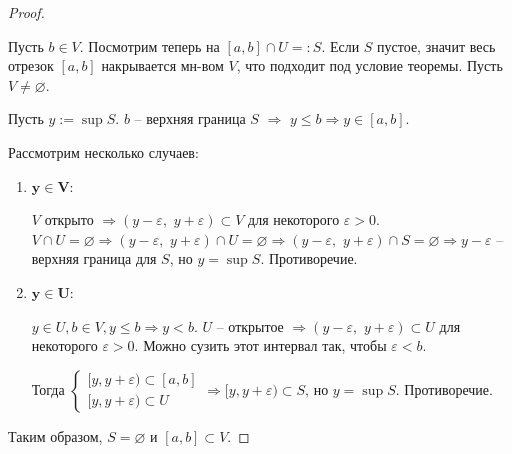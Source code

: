\begin{proof} $ $

    Пусть $b \in V$. Посмотрим теперь на $[a, b] \cap U =: S$. Если 
    $S$ пустое, значит весь отрезок $[a, b]$ накрывается мн-вом $V$,
    что подходит под условие теоремы. Пусть $V \neq \varnothing$.

    Пусть $y := \sup S$. $b$ -- верхняя граница $S$ $\Rightarrow$
    $y \leqslant b \Rightarrow y \in [a, b]$.

    Рассмотрим несколько случаев:
    \begin{enumerate}
        \item $\mathbf{y \in V}$:
        
        $V$ открыто $\Rightarrow (y - \varepsilon,\,\, y + \varepsilon)
        \subset V$ для некоторого $\varepsilon > 0$. $V \cap U =
        \varnothing \Rightarrow (y - \varepsilon,\,\, y + \varepsilon)
        \cap U = \varnothing \Rightarrow (y - \varepsilon,\,\, y + \varepsilon)
        \cap S = \varnothing \Rightarrow y - \varepsilon$ -- верхняя 
        граница для $S$, но $y = \sup S$. Противоречие.

        \item $\mathbf{y \in U}$:
        
        $y \in U, b \in V, y \leqslant b \Rightarrow y < b$. $U$ -- открытое 
        $\Rightarrow (y - \varepsilon,\,\, y + \varepsilon) \subset U$ для 
        некоторого $\varepsilon > 0$. Можно сузить этот интервал так,
        чтобы $\varepsilon < b$.
        
        Тогда $\begin{cases}
            [y, y + \varepsilon) \subset [a, b] \\
            [y, y + \varepsilon) \subset U
        \end{cases} \Rightarrow [y, y + \varepsilon) \subset S$,
        но $y = \sup S$. Противоречие.
    \end{enumerate}

    Таким образом, $S = \varnothing$ и $[a, b] \subset V$.
\end{proof}